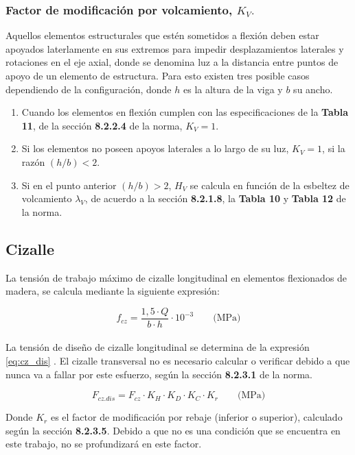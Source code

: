 \subsubsection{Factor de modificación por volcamiento, $K_V.$} Aquellos elementos estructurales que estén sometidos a flexión deben estar apoyados laterlamente en sus extremos para impedir desplazamientos laterales y rotaciones en el eje axial, donde se denomina luz a la distancia entre puntos de apoyo de un elemento de estructura. Para esto existen tres posible casos dependiendo de la configuración, donde $h$ es la altura de la viga y $b$ su ancho.
\begin{enumerate}
	\item Cuando los elementos en flexión cumplen con las especificaciones de la \textbf{Tabla 11}, de la sección \textbf{8.2.2.4} de la norma, $K_V= 1$.
	\item Si los elementos no poseen apoyos laterales a lo largo de su luz, $K_V = 1$, si la razón $(h/b) < 2$.
	\item Si en el punto anterior $(h/b) > 2$, $H_V$ se calcula en función de la esbeltez de volcamiento $\lambda_V$, de acuerdo a la sección \textbf{8.2.1.8}, la \textbf{Tabla 10} y \textbf{Tabla 12} de la norma.
\end{enumerate}

\subsection{Cizalle}
La tensión de trabajo máximo de cizalle longitudinal en elementos flexionados de madera, se calcula mediante la siguiente expresión:

\begin{equation} \label{eq:f_cz}
f_{cz} = \frac{1,5 \cdot Q}{b \cdot h} \cdot 10^{-3} \qquad \text{(MPa)}
\end{equation}
\\
La tensión de diseño de cizalle longitudinal se determina de la expresión \ref{eq:cz_dis} . El cizalle transversal no es necesario calcular o verificar debido a que nunca va a fallar por este esfuerzo, según la sección \textbf{8.2.3.1} de la norma.

\begin{equation}\label{eq:cz_dis}
	F_{cz.dis} = F_{cz} \cdot K_H \cdot K_D \cdot K_C \cdot K_r \qquad \text{(MPa)}
\end{equation}

Donde $K_r$ es el factor de modificación por rebaje (inferior o superior), calculado según la sección \textbf{8.2.3.5}. Debido a que no es una condición que se encuentra en este trabajo, no se profundizará en este factor.\\


